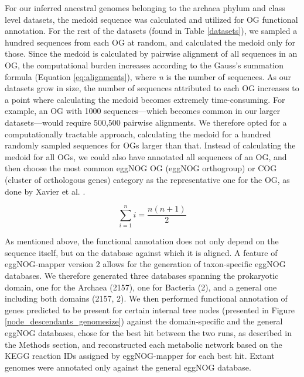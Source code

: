 For our inferred ancestral genomes belonging to the archaea phylum and class level datasets, the medoid sequence was calculated and utilized for OG functional annotation. For the rest of the datasets (found in Table \ref{datasets}), we sampled a hundred sequences from each OG at random, and calculated the medoid only for those. Since the medoid is calculated by pairwise alignment of all sequences in an OG, the computational burden increases according to the Gauss's summation formula (Equation \ref{eq:alignments}), where \textit{n} is the number of sequences. As our datasets grow in size, the number of sequences attributed to each OG increases to a point where calculating the medoid becomes extremely time-consuming. For example, an OG with 1000 sequences---which becomes common in our larger datasets---would require 500,500 pairwise alignments. We therefore opted for a computationally tractable approach, calculating the medoid for a hundred randomly sampled sequences for OGs larger than that. Instead of calculating the medoid for all OGs, we could also have annotated all sequences of an OG, and then choose the most common eggNOG OG (eggNOG orthogroup) or COG (cluster of orthologous genes) category as the representative one for the OG, as done by Xavier et al. \cite{xavier2021}. 

\begin{equation}
    \label{eq:alignments}
    \sum_{i=1}^{n} i = \frac{n(n+1)}{2}
\end{equation}

As mentioned above, the functional annotation does not only depend on the sequence itself, but on the database against which it is aligned. A feature of eggNOG-mapper version 2 \cite{cantalapiedra2021} allows for the generation of taxon-specific eggNOG databases. We therefore generated three databases spanning the prokaryotic domain, one for the Archaea (2157), one for Bacteria (2), and a general one including both domains (2157, 2). We then performed functional annotation of genes predicted to be present for certain internal tree nodes (presented in Figure \ref{node_descendants_genomesize}) against the domain-specific and the general eggNOG databases, chose for the best hit between the two runs, as described in the Methods section, and reconstructed each metabolic network based on the KEGG reaction IDs assigned by eggNOG-mapper for each best hit. Extant genomes were annotated only against the general eggNOG database. 

